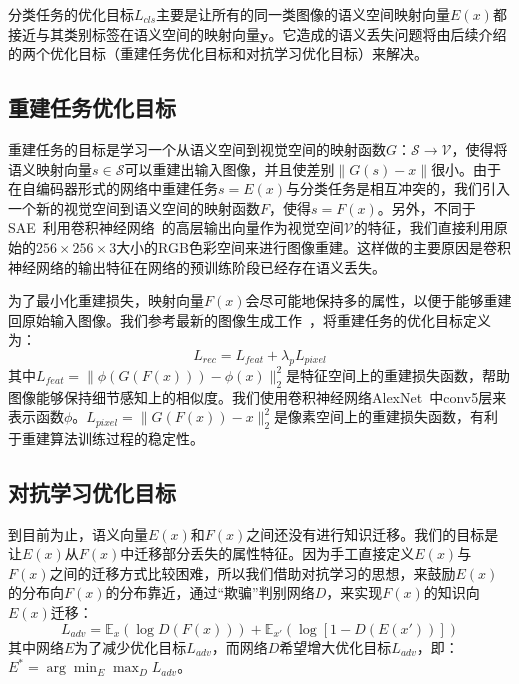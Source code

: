 分类任务的优化目标$L_{cls}$主要是让所有的同一类图像的语义空间映射向量$E(x)$都接近与其类别标签在语义空间的映射向量$\bm{y}$。它造成的语义丢失问题将由后续介绍的两个优化目标（重建任务优化目标和对抗学习优化目标）来解决。


\subsection{重建任务优化目标}
重建任务的目标是学习一个从语义空间到视觉空间的映射函数$G$：$\mathcal{S}\rightarrow \mathcal{V}$，使得将语义映射向量$s\in\mathcal{S}$可以重建出输入图像，并且使差别$\|G(s)-x\|$很小。由于在自编码器形式的网络中重建任务$s = E(x)$与分类任务是相互冲突的，我们引入一个新的视觉空间到语义空间的映射函数$F$，使得$s = F(x)$。另外，不同于SAE~\cite{kodirov2017semantic}利用卷积神经网络~\cite{he2016deep,simonyan2015very}的高层输出向量作为视觉空间$\mathcal{V}$的特征，我们直接利用原始的$256\times 256 \times 3$大小的RGB色彩空间来进行图像重建。这样做的主要原因是卷积神经网络的输出特征在网络的预训练阶段已经存在语义丢失。


为了最小化重建损失，映射向量$F(x)$会尽可能地保持多的属性，以便于能够重建回原始输入图像。我们参考最新的图像生成工作~\cite{johnson2016perceptual,dosovitskiy2016generating,ledig2017photo}，将重建任务的优化目标定义为：
\begin{equation}\label{ch3:eq:eq_3}
L_{rec} = L_{feat}+\lambda_p L_{pixel}
\end{equation}
其中$L_{feat} = \|\phi\left(G\left(F(x)\right)\right)-\phi(x)\|^2_2$是特征空间上的重建损失函数，帮助图像能够保持细节感知上的相似度。我们使用卷积神经网络AlexNet~\cite{krizhevsky2012imagenet}中conv5层来表示函数$\phi$。$L_{pixel} = \|G(F(x))-x\|^2_2$是像素空间上的重建损失函数，有利于重建算法训练过程的稳定性。


\subsection{对抗学习优化目标}
到目前为止，语义向量$E(x)$和$F(x)$之间还没有进行知识迁移。我们的目标是让$E(x)$从$F(x)$中迁移部分丢失的属性特征。因为手工直接定义$E(x)$与$F(x)$之间的迁移方式比较困难，所以我们借助对抗学习的思想，来鼓励$E(x)$的分布向$F(x)$的分布靠近，通过“欺骗”判别网络$D$，来实现$F(x)$的知识向$E(x)$迁移：
\begin{equation} \label{ch3:eq:eq_4}
L_{adv} = \mathbb{E}_{x}\left( \log D(F(x)) \right) + \mathbb{E}_{x'}\left( \log \left[1-D(E(x'))\right] \right)
\end{equation}
其中网络$E$为了减少优化目标$L_{adv}$，而网络$D$希望增大优化目标$L_{adv}$，即：$E^* = \arg\min_E \max_D L_{adv}$。

